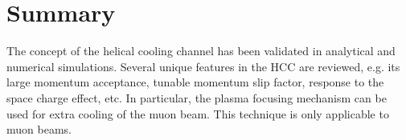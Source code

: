 \documentclass[11pt]{article}
\begin{document}
\section{Summary}
The concept of the helical cooling channel has been validated in analytical and numerical simulations. 
Several unique features in the HCC are reviewed, e.g. its large momentum acceptance, tunable momentum slip factor, response to the space charge effect, etc. In particular, the plasma focusing mechanism can be used for extra cooling of the muon beam. This technique is only applicable to muon beams.

%
%
%





\end{document}
